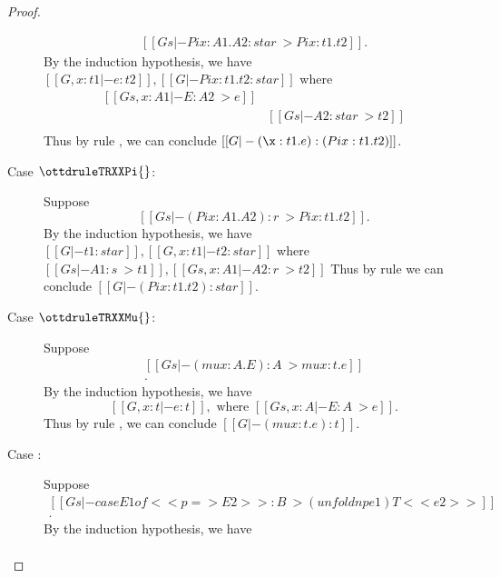 \begin{proof}
\begin{description}
\[\begin{array}{l}
            [[Gs |- Pi x:A1.A2 : star ~> Pi x:t1.t2]].
            \end{array} \]
            By the induction hypothesis, we have 
            $
            [[G, x : t1 |- e:t2]],
            [[G |- Pi x:t1.t2 : star]]
            $
            where 
            \[
            \begin{array}{ll}
            [[Gs, x : A1 |- E : A2 ~> e]] & \\
            [[Gs |- A1 : star ~> t1]] & [[Gs |- A2 : star ~> t2]] \\
            [[Gs |- (Pi x:A1.A2) : s ~> Pi x:t1.t2]] &
            \end{array}
            \]
            Thus by rule , we can conclude $[[G |- (\x:t1.e):(Pi x:t1.t2)]]$.
        \item[Case $\ottdruleTRXXPi{}$:] $\quad$ \\ Suppose 
                \[ [[Gs |- (Pi x:A1.A2):r ~> Pi x:t1.t2]]. \] 
            By the induction hypothesis, we have 
            $
                [[G |- t1 : star]], [[G, x : t1 |- t2 : star]]
            $
            where
            $
                [[Gs |- A1 : s ~> t1]], [[Gs, x: A1 |- A2 : r ~> t2]]
            $
            Thus by rule  we can conclude $[[G |- (Pi x:t1.t2) : star]]$.
        \item[Case $\ottdruleTRXXMu{}$:] $\quad$ \\ Suppose 
                \[\begin{array}{l}
                    [[Gs |- (mu x:A . E):A ~> mu x:t.e]] \\
                    [[Gs |- A : star ~> t]]. 
                \end{array}\]
            By the induction hypothesis, we have 
                \[ [[G, x : t |- e : t]],\text{ where }[[Gs, x:A |- E:A ~> e]]. \] 
            Thus by rule , we can conclude $[[G |- (mu x:t.e) : t]]$.
        \item[Case \resizebox{.9\columnwidth}{!}{$\ottdruleTRXXCaseT{}$}:] $\quad$ \\ Suppose 
            \[\begin{array}{l}
                [[Gs |- case E1 of << p => E2>> : B ~> (unfoldnp e1) T <<e2>>]] \\
                [[Gs |- B : star ~> T]].
            \end{array}\]
            By the induction hypothesis, we have 
            \[\begin{array}{ll}

\end{array}\]
\end{description}
\end{proof}
